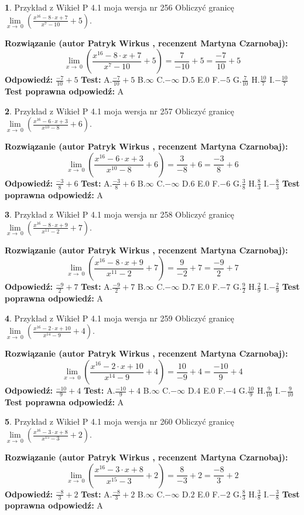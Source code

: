 \documentclass[12pt, a4paper]{article}
\theoremstyle{definition} %
\newtheorem{zad}{}
\newcommand{\zadStart}[1]{\begin{zad}#1\newline}
\newcommand{\zadStop}{\end{zad}}
\newcommand{\rozwStart}[2]{\noindent \textbf{Rozwiązanie (autor #1 , recenzent #2): }\newline}
\newcommand{\rozwStop}{\newline}
\newcommand{\odpStart}{\noindent \textbf{Odpowiedź:}\newline}
\newcommand{\odpStop}{\newline}
\newcommand{\testStart}{\noindent \textbf{Test:}\newline}
\newcommand{\testStop}{\newline}
\newcommand{\kluczStart}{\noindent \textbf{Test poprawna odpowiedź:}\newline}
\newcommand{\kluczStop}{\newline}
\begin{document}
\zadStart{Przykład z Wikieł P 4.1 moja wersja nr 256}
Obliczyć granicę $\lim\limits_{x\to\ 0}(\frac{x^{16}-8 \cdot x +7}{x^{7}-10}+5)$.
\zadStop
\rozwStart{Patryk Wirkus}{Martyna Czarnobaj}
$$\lim\limits_{x\to\ 0}(\frac{x^{16}-8 \cdot x +7}{x^{7}-10}+5)=\frac{7}{-10}+5=\frac{-7}{10}+5$$
\rozwStop
\odpStart
$\frac{-7}{10}+5$
\odpStop
\testStart
A.$\frac{-7}{10}+5$
B.$\infty$
C.$-\infty$
D.$5$
E.$0$
F.$-5$
G.$\frac{7}{10}$
H.$\frac{10}{7}$
I.$-\frac{10}{7}$
\testStop
\kluczStart
A
\kluczStop



\zadStart{Przykład z Wikieł P 4.1 moja wersja nr 257}
Obliczyć granicę $\lim\limits_{x\to\ 0}(\frac{x^{16}-6 \cdot x +3}{x^{10}-8}+6)$.
\zadStop
\rozwStart{Patryk Wirkus}{Martyna Czarnobaj}
$$\lim\limits_{x\to\ 0}(\frac{x^{16}-6 \cdot x +3}{x^{10}-8}+6)=\frac{3}{-8}+6=\frac{-3}{8}+6$$
\rozwStop
\odpStart
$\frac{-3}{8}+6$
\odpStop
\testStart
A.$\frac{-3}{8}+6$
B.$\infty$
C.$-\infty$
D.$6$
E.$0$
F.$-6$
G.$\frac{3}{8}$
H.$\frac{8}{3}$
I.$-\frac{8}{3}$
\testStop
\kluczStart
A
\kluczStop



\zadStart{Przykład z Wikieł P 4.1 moja wersja nr 258}
Obliczyć granicę $\lim\limits_{x\to\ 0}(\frac{x^{16}-8 \cdot x +9}{x^{11}-2}+7)$.
\zadStop
\rozwStart{Patryk Wirkus}{Martyna Czarnobaj}
$$\lim\limits_{x\to\ 0}(\frac{x^{16}-8 \cdot x +9}{x^{11}-2}+7)=\frac{9}{-2}+7=\frac{-9}{2}+7$$
\rozwStop
\odpStart
$\frac{-9}{2}+7$
\odpStop
\testStart
A.$\frac{-9}{2}+7$
B.$\infty$
C.$-\infty$
D.$7$
E.$0$
F.$-7$
G.$\frac{9}{2}$
H.$\frac{2}{9}$
I.$-\frac{2}{9}$
\testStop
\kluczStart
A
\kluczStop



\zadStart{Przykład z Wikieł P 4.1 moja wersja nr 259}
Obliczyć granicę $\lim\limits_{x\to\ 0}(\frac{x^{16}-2 \cdot x +10}{x^{14}-9}+4)$.
\zadStop
\rozwStart{Patryk Wirkus}{Martyna Czarnobaj}
$$\lim\limits_{x\to\ 0}(\frac{x^{16}-2 \cdot x +10}{x^{14}-9}+4)=\frac{10}{-9}+4=\frac{-10}{9}+4$$
\rozwStop
\odpStart
$\frac{-10}{9}+4$
\odpStop
\testStart
A.$\frac{-10}{9}+4$
B.$\infty$
C.$-\infty$
D.$4$
E.$0$
F.$-4$
G.$\frac{10}{9}$
H.$\frac{9}{10}$
I.$-\frac{9}{10}$
\testStop
\kluczStart
A
\kluczStop



\zadStart{Przykład z Wikieł P 4.1 moja wersja nr 260}
Obliczyć granicę $\lim\limits_{x\to\ 0}(\frac{x^{16}-3 \cdot x +8}{x^{15}-3}+2)$.
\zadStop
\rozwStart{Patryk Wirkus}{Martyna Czarnobaj}
$$\lim\limits_{x\to\ 0}(\frac{x^{16}-3 \cdot x +8}{x^{15}-3}+2)=\frac{8}{-3}+2=\frac{-8}{3}+2$$
\rozwStop
\odpStart
$\frac{-8}{3}+2$
\odpStop
\testStart
A.$\frac{-8}{3}+2$
B.$\infty$
C.$-\infty$
D.$2$
E.$0$
F.$-2$
G.$\frac{8}{3}$
H.$\frac{3}{8}$
I.$-\frac{3}{8}$
\testStop
\kluczStart
A
\kluczStop
\end{document}
